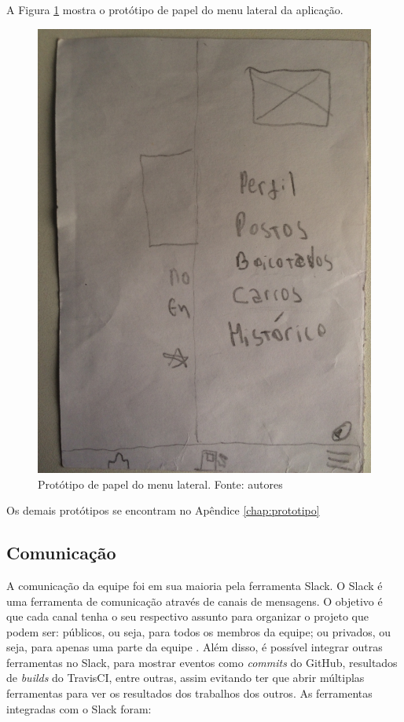 A Figura \ref{img:prototipo_de_papel_menu_lateral} mostra o protótipo de papel do menu lateral da aplicação.
\begin{figure}[H]
    \centering
    \includegraphics[scale=0.05, angle=-90]{figuras/prototipo_papel_menu.jpg}
    \caption[Protótipo de papel do menu lateral]{Protótipo de papel do menu lateral. Fonte: autores}
    \label{img:prototipo_de_papel_menu_lateral}
\end{figure}

Os demais protótipos se encontram no Apêndice \ref{chap:prototipo}

\subsection{Comunicação}

A comunicação da equipe foi em sua maioria pela ferramenta Slack. O Slack é uma ferramenta de comunicação através de canais de mensagens. O objetivo é que cada canal tenha o seu respectivo assunto para organizar o projeto que podem ser: públicos, ou seja, para todos os membros da equipe; ou privados, ou seja, para apenas uma parte da equipe \cite{slack}. Além disso, é possível integrar outras ferramentas no Slack, para mostrar eventos como \textit{commits} do GitHub, resultados de \textit{builds} do TravisCI, entre outras, assim evitando ter que abrir múltiplas ferramentas para ver os resultados dos trabalhos dos outros. As ferramentas integradas com o Slack foram:

